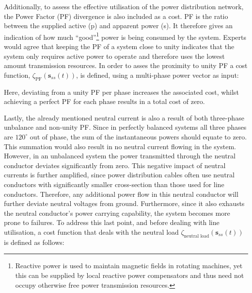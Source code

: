 
Additionally, to assess the effective utilisation of the power distribution network, the Power Factor (PF) divergence is also included as a cost.
PF is the ratio between the supplied active (p) and apparent power (s).
It therefore gives an indication of how much ``good''\footnote[1]{Reactive power is used to maintain magnetic fields in rotating machines, yet this can be supplied by local reactive power compensators and thus need not occupy otherwise free power transmission resources.} power is being consumed by the system.
Experts would agree that keeping the PF of a system close to unity indicates that the system only requires active power to operate and therefore uses the lowest amount transmission resources.
In order to asses the proximity to unity PF a cost function, $\zeta_\text{PF}(\textbf{s}_{ss}(t))$, is defined, using a multi-phase power vector as input:



Here, deviating from a unity PF per phase increases the associated cost, whilst achieving a perfect PF for each phase results in a total cost of zero.


Lastly, the already mentioned neutral current is also a result of both three-phase unbalance and non-unity PF.
Since in perfectly balanced systems all three phases are $120^\circ$ out of phase, the sum of the instantaneous powers should equate to zero.
This summation would also result in no neutral current flowing in the system.
However, in an unbalanced system the power transmitted through the neutral conductor deviates significantly from zero.
This negative impact of neutral currents is further amplified, since power distribution cables often use neutral conductors with significantly smaller cross-section than those used for line conductors.
Therefore, any additional power flow in this neutral conductor will further deviate neutral voltages from ground.
Furthermore, since it also exhausts the neutral conductor's power carrying capability, the system becomes more prone to failures.
To address this last point, and before dealing with line utilisation, a cost function that deals with the neutral load $\zeta_\text{neutral load}(\textbf{s}_{ss}(t))$ is defined as follows:

